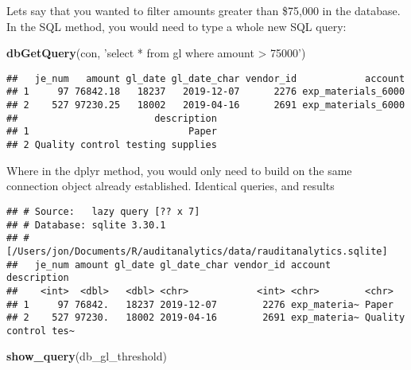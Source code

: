 \documentclass[
]{book}
\newenvironment{Shaded}{\begin{snugshade}}{\end{snugshade}}
\newcommand{\DecValTok}[1]{\textcolor[rgb]{0.00,0.00,0.81}{#1}}
\newcommand{\KeywordTok}[1]{\textcolor[rgb]{0.13,0.29,0.53}{\textbf{#1}}}
\newcommand{\NormalTok}[1]{#1}
\newcommand{\OperatorTok}[1]{\textcolor[rgb]{0.81,0.36,0.00}{\textbf{#1}}}
\newcommand{\StringTok}[1]{\textcolor[rgb]{0.31,0.60,0.02}{#1}}
\begin{document}
Lets say that you wanted to filter amounts greater than \$75,000 in the database. In the SQL method, you would need to type a whole new SQL query:

\begin{Shaded}
\begin{Highlighting}[]
\KeywordTok{dbGetQuery}\NormalTok{(con, }\StringTok{'select * from gl where amount > 75000'}\NormalTok{)}
\end{Highlighting}
\end{Shaded}

\begin{verbatim}
##   je_num   amount gl_date gl_date_char vendor_id            account
## 1     97 76842.18   18237   2019-12-07      2276 exp_materials_6000
## 2    527 97230.25   18002   2019-04-16      2691 exp_materials_6000
##                        description
## 1                            Paper
## 2 Quality control testing supplies
\end{verbatim}

Where in the dplyr method, you would only need to build on the same connection object already established. Identical queries, and results

\begin{Shaded}
\end{Shaded}

\begin{verbatim}
## # Source:   lazy query [?? x 7]
## # Database: sqlite 3.30.1
## #   [/Users/jon/Documents/R/auditanalytics/data/rauditanalytics.sqlite]
##   je_num amount gl_date gl_date_char vendor_id account      description         
##    <int>  <dbl>   <dbl> <chr>            <int> <chr>        <chr>               
## 1     97 76842.   18237 2019-12-07        2276 exp_materia~ Paper               
## 2    527 97230.   18002 2019-04-16        2691 exp_materia~ Quality control tes~
\end{verbatim}

\begin{Shaded}
\begin{Highlighting}[]
\KeywordTok{show_query}\NormalTok{(db_gl_threshold)}
\end{Highlighting}
\end{Shaded}
\end{document}

